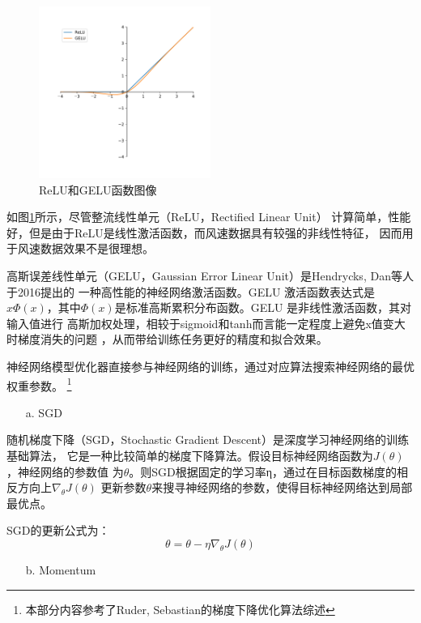 \documentclass[AutoFakeBold]{LZUThesis}
\begin{document}
\begin{figure}[H]
	\centering
    \includegraphics[width=0.5\textwidth]{figures/relu_gelu.pdf}
    \caption{ReLU和GELU函数图像}
    \label{fig_relu_gelu}
\end{figure}

如图\ref{fig_relu_gelu}所示，尽管整流线性单元（ReLU，Rectified Linear Unit）
计算简单，性能好，但是由于ReLU是线性激活函数，而风速数据具有较强的非线性特征，
因而用于风速数据效果不是很理想。

高斯误差线性单元（GELU，Gaussian Error Linear Unit）是Hendrycks, Dan等人于2016提出的
一种高性能的神经网络激活函数。GELU 激活函数表达式是
$x\Phi(x)$，其中$\Phi(x)$是标准高斯累积分布函数。GELU 是非线性激活函数，其对输入值进行
高斯加权处理，相较于sigmoid和tanh而言能一定程度上避免x值变大时梯度消失的问题
，从而带给训练任务更好的精度和拟合效果。

神经网络模型优化器直接参与神经网络的训练，通过对应算法搜索神经网络的最优权重参数。
\footnote{本部分内容参考了Ruder, Sebastian的梯度下降优化算法综述}
\begin{itemize}
    \item[a. ] SGD
\end{itemize}

随机梯度下降（SGD，Stochastic Gradient Descent）是深度学习神经网络的训练基础算法，
它是一种比较简单的梯度下降算法。假设目标神经网络函数为$J(\theta)$，神经网络的参数值
为$\theta$。则SGD根据固定的学习率η，通过在目标函数梯度的相反方向上$\nabla_\theta J( \theta)$
更新参数$\theta$来搜寻神经网络的参数，使得目标神经网络达到局部最优点。

SGD的更新公式为：
$$\theta = \theta - \eta\nabla_\theta J( \theta)$$

\begin{itemize}
    \item[b. ] Momentum
\end{itemize}
\end{document}
